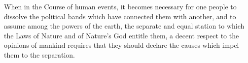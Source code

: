 \documentclass[12pt,letter,english]{report}
\begin{document}
When in the Course of human events, it becomes necessary for one people to
dissolve the political bands which have connected them with another, and to
assume among the powers of the earth, the separate and equal station to which
the Laws of Nature and of Nature's God entitle them, a decent respect to the
opinions of mankind requires that they should declare the causes which impel
them to the separation.
\end{document}
